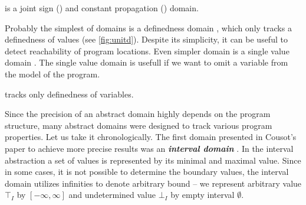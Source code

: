 \begin{marginfigure}%
    \centering
{}
    \caption{ is a joint sign () and constant propagation () domain.}
    \label{fig:cpsign}%
\end{marginfigure}%

Probably the simplest of domains is a definedness domain , which only
tracks a definedness of values (see \autoref{fig:unitd}). Despite its
simplicity, it can be useful to detect reachability of program locations. Even
simpler domain is a single value domain . The single value domain is
usefull if we want to omit a variable from the model of the program.

\begin{marginfigure}%
    \centering
    \caption{ tracks only definedness of variables.}
    \label{fig:unitd}%
\end{marginfigure}%

Since the precision of an abstract domain highly depends on the program
structure, many abstract domains were designed to track various program
properties. Let us take it chronologically. The first domain presented in
Cousot's paper \cite{Cousot1977} to achieve more precise results was an
\textbf{\emph{interval domain}} . In the interval abstraction a set of values
is represented by its minimal and maximal value. Since in some cases, it is not
possible to determine the boundary values, the interval domain utilizes
infinities to denote arbitrary bound -- we represent arbitrary value
$\top_{\textit{I}}$ by $[-\infty, \infty]$ and undetermined value $\bot_{\textit{I}}$
by empty interval $\emptyset$.

